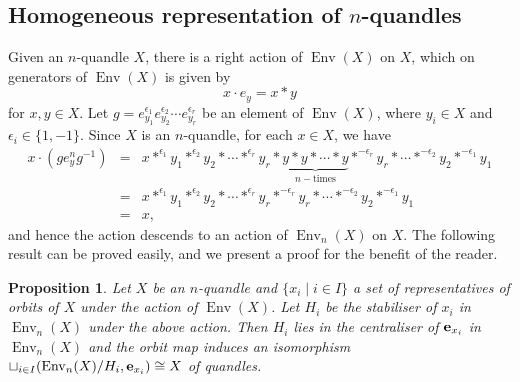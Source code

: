 \documentclass[12pt]{amsart}
\newtheorem{prop}[theorem]{Proposition}
\theoremstyle{definition}
\numberwithin{equation}{subsection}
\newcommand{\Env}{\operatorname{Env}}
\begin{document}
	

\subsection{Homogeneous representation of $n$-quandles}
Given an $n$-quandle $X$, there is a right action of $\Env(X)$ on $X$, which on generators of  $\Env(X)$ is given by $$x \cdot e_y  = x*y$$ for $x, y \in X$. Let $g=e_{y_1}^{\epsilon_1}e_{y_2}^{\epsilon_2} \cdots e_{y_r}^{\epsilon_r}$ be an element of $\Env(X)$, where  $y_i \in X$ and $\epsilon_i \in \{1, -1 \} $. Since $X$ is an $n$-quandle, for each $x \in X$, we have
\begin{eqnarray*}
x \cdot (g e_y^n g^{-1})  &=& x*^{\epsilon_1} y_1 *^{\epsilon_2} y_2* \cdots *^{\epsilon_r} y_r *\underbrace{y * y* \cdots *y}_{n-\textrm{times}} *^{-\epsilon_r} y_r* \cdots *^{-\epsilon_2} y_2 *^{-\epsilon_1} y_1\\
&=& x*^{\epsilon_1} y_1 *^{\epsilon_2} y_2* \cdots *^{\epsilon_r} y_r *^{-\epsilon_r} y_r* \cdots *^{-\epsilon_2} y_2 *^{-\epsilon_1} y_1\\
&=& x,
\end{eqnarray*}
and hence the action descends to an action of $\Env_n(X)$ on $X$. The following result can be proved easily, and we present a proof for the benefit of the reader.

\begin{prop}\label{finiteness of n-quandle}
Let $X$ be an $n$-quandle and $\{x_i \mid i \in I\}$ a set of representatives of orbits of $X$ under the action of $\Env(X)$. Let $H_i$ be the stabiliser of $x_{i}$ in $\Env_n(X)$ under the above action. Then $H_i$ lies in the centraliser of $\bold{e}_{x_i}$ in $\Env_n(X)$ and the orbit map induces an isomorphism $\sqcup_{i \in I} (\Env_n(X)/H_i,\bold{e}_{x_i}) \cong X$ of quandles.
\end{prop}
\end{document}
